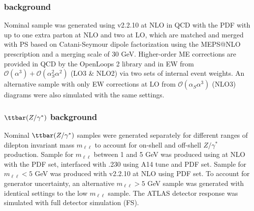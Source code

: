 \documentclass[../thesis.tex]{subfiles}
\begin{document}
\subsubsection*{\ttW background}
Nominal \ttW sample was generated using \sherpa v2.2.10 \citep{Bothmann:2019yzt} at \acs{NLO} in \acs{QCD} with the \nnpdfnnlo \citep{Ball:2014uwa} \acs{PDF} with up to one extra parton at \acs{NLO} and two at \acs{LO}, which are matched and merged with \sherpa \acs{PS} based on Catani-Seymour dipole factorization \citep{Schumann:2007mg} using the MEPS@NLO prescription \citep{Hoeche:2011fd, Hoeche:2012yf, Catani:2001cc, Hoeche:2009rj} and a merging scale of 30 GeV. Higher-order \acs{ME} corrections are provided in \acs{QCD} by the OpenLoops 2 library \citep{Cascioli:2011va, Denner:2016kdg, Buccioni:2019sur} and in \acs{EW} from $\mathcal{O}(\alpha^3)+\mathcal{O}(\alpha^2_S\alpha^2)$ (LO3 \& NLO2) via two sets of internal event weights. An alternative sample with only \acs{EW} corrections at \acs{LO} from $\mathcal{O}(\alpha_S\alpha^3)$ (NLO3) diagrams were also simulated with the same settings.
\subsubsection*{$\ttbar(Z/\gamma^*)$ background}
Nominal $\ttbar(Z/\gamma^*)$ samples were generated separately for different ranges of dilepton invariant mass $m_{\ell\ell}$ to account for on-shell and off-shell $Z/\gamma^*$ production. Sample for $m_{\ell\ell}$ between 1 and 5 GeV was produced using \mgamc \citep{Alwall:2014hca} at \acs{NLO} with the \nnpdfnlo \citep{Ball:2014uwa} \acs{PDF} set, interfaced with \pythia.230 \citep{Sjostrand:2014zea} using A14 tune \citep{ATL-PHYS-PUB-2014-021} and \nnpdftwo \acs{PDF} set. Sample for $m_{\ell\ell} < 5$ GeV was produced with \sherpa v2.2.10 \citep{Bothmann:2019yzt} at \acs{NLO} using \nnpdfnnlo \acs{PDF} set. To account for generator uncertainty, an alternative $m_{\ell\ell}>5$ GeV sample was generated with identical settings to the low $m_{\ell\ell}$ sample. The ATLAS detector response was simulated with full detector simulation (\acs{FS}).
\end{document}
